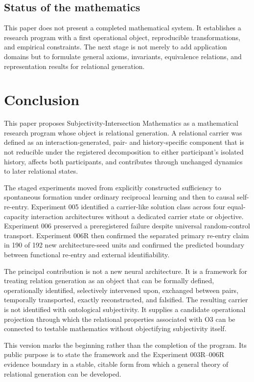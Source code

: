 \documentclass[11pt,a4paper]{article}
\begin{document}
\subsection{Status of the mathematics}

This paper does not present a completed mathematical system. It establishes a research program with a first operational object, reproducible transformations, and empirical constraints. The next stage is not merely to add application domains but to formulate general axioms, invariants, equivalence relations, and representation results for relational generation.

\section{Conclusion}

This paper proposes Subjectivity-Intersection Mathematics as a mathematical research program whose object is relational generation. A relational carrier was defined as an interaction-generated, pair- and history-specific component that is not reducible under the registered decomposition to either participant's isolated history, affects both participants, and contributes through unchanged dynamics to later relational states.

The staged experiments moved from explicitly constructed sufficiency to spontaneous formation under ordinary reciprocal learning and then to causal self-re-entry. Experiment 005 identified a carrier-like solution class across four equal-capacity interaction architectures without a dedicated carrier state or objective. Experiment 006 preserved a preregistered failure despite universal random-control transport. Experiment 006R then confirmed the separated primary re-entry claim in 190 of 192 new architecture-seed units and confirmed the predicted boundary between functional re-entry and external identifiability.

The principal contribution is not a new neural architecture. It is a framework for treating relation generation as an object that can be formally defined, operationally identified, selectively intervened upon, exchanged between pairs, temporally transported, exactly reconstructed, and falsified. The resulting carrier is not identified with ontological subjectivity. It supplies a candidate operational projection through which the relational properties associated with O3 can be connected to testable mathematics without objectifying subjectivity itself.

This version marks the beginning rather than the completion of the program. Its public purpose is to state the framework and the Experiment 003R--006R evidence boundary in a stable, citable form from which a general theory of relational generation can be developed.
\end{document}
